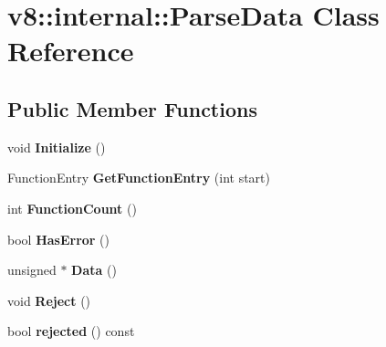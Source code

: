 \hypertarget{classv8_1_1internal_1_1_parse_data}{}\section{v8\+:\+:internal\+:\+:Parse\+Data Class Reference}
\label{classv8_1_1internal_1_1_parse_data}
\subsection*{Public Member Functions}
\begin{DoxyCompactItemize}
\item 
void {\bfseries Initialize} ()\hypertarget{classv8_1_1internal_1_1_parse_data_ab882f568019e30ca80b6b42f17997e40}{}\label{classv8_1_1internal_1_1_parse_data_ab882f568019e30ca80b6b42f17997e40}

\item 
Function\+Entry {\bfseries Get\+Function\+Entry} (int start)\hypertarget{classv8_1_1internal_1_1_parse_data_abd9155d674f8b2eea772140c913f1a6b}{}\label{classv8_1_1internal_1_1_parse_data_abd9155d674f8b2eea772140c913f1a6b}

\item 
int {\bfseries Function\+Count} ()\hypertarget{classv8_1_1internal_1_1_parse_data_aea4434984041962893f383394c63b551}{}\label{classv8_1_1internal_1_1_parse_data_aea4434984041962893f383394c63b551}

\item 
bool {\bfseries Has\+Error} ()\hypertarget{classv8_1_1internal_1_1_parse_data_a6a3886d7d418beea19699e3579a37083}{}\label{classv8_1_1internal_1_1_parse_data_a6a3886d7d418beea19699e3579a37083}

\item 
unsigned $\ast$ {\bfseries Data} ()\hypertarget{classv8_1_1internal_1_1_parse_data_ab6393ae557cfea7ba7cb75fdc82965cb}{}\label{classv8_1_1internal_1_1_parse_data_ab6393ae557cfea7ba7cb75fdc82965cb}

\item 
void {\bfseries Reject} ()\hypertarget{classv8_1_1internal_1_1_parse_data_a941e7a3940f1c64dd9e93a9515635b5f}{}\label{classv8_1_1internal_1_1_parse_data_a941e7a3940f1c64dd9e93a9515635b5f}

\item 
bool {\bfseries rejected} () const \hypertarget{classv8_1_1internal_1_1_parse_data_a115e5b07fd31436767da36ca49ebfe86}{}\label{classv8_1_1internal_1_1_parse_data_a115e5b07fd31436767da36ca49ebfe86}

\end{DoxyCompactItemize}
